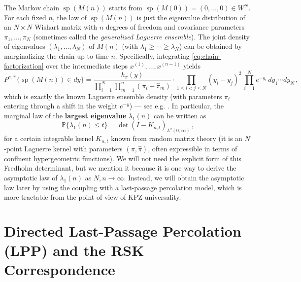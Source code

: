 \documentclass[letterpaper,11pt,oneside,reqno]{article}
\numberwithin{equation}{section}
\theoremstyle{definition}
\begin{document}
The Markov chain $\operatorname{sp}(M(n))$ starts from $\operatorname{sp}(M(0)) = (0,\dots,0)\in W^N$. For each fixed $n$, the law of $\operatorname{sp}(M(n))$ is just the eigenvalue distribution of an $N\times N$ Wishart matrix with $n$ degrees of freedom and covariance parameters $\pi_1,\dots,\pi_N$ (sometimes called the \emph{generalized Laguerre ensemble}). The joint density of eigenvalues $(\lambda_1,\dots,\lambda_N)$ of $M(n)$ (with $\lambda_1\ge\cdots\ge\lambda_N$) can be obtained by marginalizing the chain up to time $n$. Specifically, integrating \eqref{eq:chain-factorization} over the intermediate steps $x^{(1)},\dots,x^{(n-1)}$ yields
\[
P^{\pi,\hat\pi}\{\operatorname{sp}(M(n)) \in dy\} = \frac{h_\pi(y)}{\prod_{i=1}^N \prod_{m=1}^n (\pi_i+\hat\pi_m)} \cdot \prod_{1\le i<j\le N} (y_i - y_j)^2 \, \prod_{i=1}^N e^{-y_i}\, dy_1\cdots dy_N\,,
\]
which is exactly the known Laguerre ensemble density (with parameters $\pi_i$ entering through a shift in the weight $e^{-y}$) --- see e.g. \cite[Ch.~4]{Mehta2004}. In particular, the marginal law of the \textbf{largest eigenvalue} $\lambda_1(n)$ can be written as
\begin{equation}\label{eq:Fredholm}
\mathbb{P}\{\lambda_1(n) \le t\} = \det(I - K_{n,t})_{L^2(0,\infty)}\,,
\end{equation}
for a certain integrable kernel $K_{n,t}$ known from random matrix theory (it is an $N$-point Laguerre kernel with parameters $(\pi,\hat\pi)$, often expressible in terms of confluent hypergeometric functions). We will not need the explicit form of this Fredholm determinant, but we mention it because it is one way to derive the asymptotic law of $\lambda_1(n)$ as $N,n\to\infty$. Instead, we will obtain the asymptotic law later by using the coupling with a last-passage percolation model, which is more tractable from the point of view of KPZ universality.

\section{Directed Last-Passage Percolation (LPP) and the RSK Correspondence}
\end{document}
